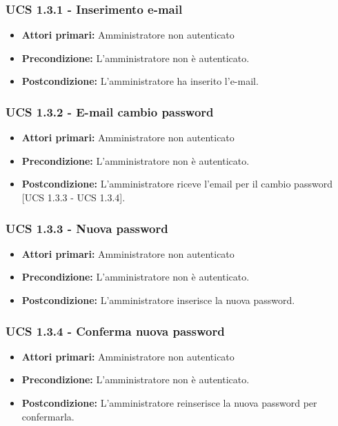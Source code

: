 \subsubsection{UCS 1.3.1 - Inserimento e-mail}
\begin{itemize}
\item \textbf{Attori primari:} Amministratore non autenticato
\item \textbf{Precondizione:} L'amministratore non è autenticato. %
\item \textbf{Postcondizione:} L'amministratore ha inserito l'e-mail.
\end{itemize}

\subsubsection{UCS 1.3.2 - E-mail cambio password}
\begin{itemize}
\item \textbf{Attori primari:} Amministratore non autenticato
\item \textbf{Precondizione:} L'amministratore non è autenticato.
\item \textbf{Postcondizione:} L'amministratore riceve l'email per il cambio password [UCS 1.3.3 - UCS 1.3.4].
\end{itemize}

\subsubsection{UCS 1.3.3 - Nuova password}
\begin{itemize}
\item \textbf{Attori primari:} Amministratore non autenticato
\item \textbf{Precondizione:}  L'amministratore non è autenticato.
\item \textbf{Postcondizione:} L'amministratore inserisce la nuova password.
\end{itemize}

\subsubsection{UCS 1.3.4 - Conferma nuova password}
\begin{itemize}
\item \textbf{Attori primari:} Amministratore non autenticato
\item \textbf{Precondizione:} L'amministratore non è autenticato.
\item \textbf{Postcondizione:} L'amministratore reinserisce la nuova password per confermarla.
\end{itemize}

